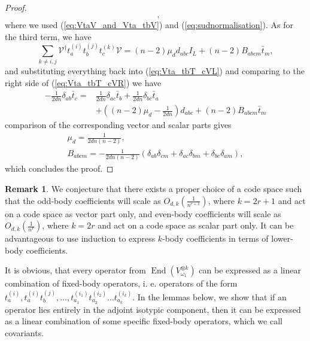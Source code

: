 \documentclass[10pt,twocolumn,superscriptaddress,aps,amsmath,amssymb,citeautoscript,floatfix,prx]{revtex4-2}
\theoremstyle{plain}
\theoremstyle{plain}
\theoremstyle{plain}
\theoremstyle{plain}
\theoremstyle{plain}
\theoremstyle{plain}
\theoremstyle{plain}
\theoremstyle{definition}
\newtheorem{smremark}[smtheorem]{Remark}
\theoremstyle{plain}
\begin{document}
\begin{appendix}
\begin{proof}
\[\begin{aligned}
        \end{aligned},
    \]
    where we used (\ref{eq:VtaV_and_Vta_tbV}) and (\ref{eq:sudnormalisation}). As for the third term, we have
    \[
        \sum_{k \neq i, j} \mathcal{V}^{\dagger} t_a^{(i)} t_b^{(j)} t_c^{(k)} \mathcal{V}=(n-2) \mu_d d_{a b c} I_L+(n-2) B_{a b c m} \bar{t}_m,
    \]
    and substituting everything back into (\ref{eq:Vta_tbT_cVL}) and comparing to the right side of (\ref{eq:Vta_tbT_cVR}) we have
    \[
        \begin{aligned}
        -\frac{1}{2 d n} \delta_{a b} \bar{t}_c = & \frac{1}{2 d n} \delta_{a c} \bar{t}_b +\frac{1}{2 d n} \delta_{b c} \bar{t}_a \\
        & +\left((n-2) \mu_d-\frac{1}{2 d n}\right) d_{a b c} +(n-2) B_{a b c m} \bar{t}_m
        \end{aligned}
    \]
    comparison of the corresponding vector and scalar parts gives
    \[
        \begin{gathered}
        \mu_d=\frac{1}{2 d n(n-2)}, \\
        B_{a b c m}=-\frac{1}{2 d n(n-2)}\left(\delta_{a b} \delta_{c m}+\delta_{a c} \delta_{b m}+\delta_{b c} \delta_{a m}\right),
        \end{gathered}
    \]
    which concludes the proof.
\end{proof}

\begin{smremark}
    We conjecture that there exists a proper choice of a code space such that the odd-body coefficients will scale as $O_{d,k}\left(\frac{1}{n^{r+1}}\right)$, 
    where $k=2r+1$ and act on a code space as vector part only, and even-body coefficients will scale as $O_{d,k}\left(\frac{1}{n^r}\right)$, 
    where $k=2r$ and act on a code space as scalar part only. It can be advantageous to use induction to express $k$-body coefficients in terms of lower-body coefficients. 
\end{smremark}

It is obvious, that every operator from $\operatorname{End}(V_{\omega_1}^{\otimes k})$ 
can be expressed as a linear combination of fixed-body operators, i. e. operators of the form
$t_a^{(i)}, t_a^{(i)} t_b^{(j)}, ..., t_{a_1}^{(i_1)} t_{a_2}^{(i_2)} ... t_{a_k}^{(i_k)}$. 
In the lemmas below, we show that if an operator lies entirely in the adjoint isotypic component, then it can be expressed as 
a linear combination of some specific fixed-body operators, which we call covariants.


\end{appendix}
\end{document}
